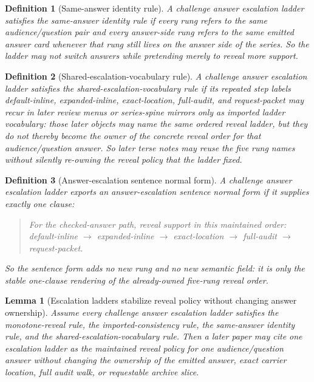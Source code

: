 \documentclass[11pt]{article}
\newtheorem{definition}{Definition}
\newtheorem{lemma}{Lemma}
\begin{document}
\begin{definition}[Same-answer identity rule]
A challenge answer escalation ladder satisfies the \emph{same-answer identity rule} if every rung refers to the same audience/question pair and every answer-side rung refers to the same emitted answer card whenever that rung still lives on the answer side of the series.
So the ladder may not switch answers while pretending merely to reveal more support.
\end{definition}

\begin{definition}[Shared-escalation-vocabulary rule]
A challenge answer escalation ladder satisfies the \emph{shared-escalation-vocabulary rule} if its repeated step labels \textsf{default-inline}, \textsf{expanded-inline}, \textsf{exact-location}, \textsf{full-audit}, and \textsf{request-packet} may recur in later review menus or series-spine mirrors only as imported ladder vocabulary: those later objects may name the same ordered reveal ladder, but they do not thereby become the owner of the concrete reveal order for that audience/question answer.
So later terse notes may reuse the five rung names without silently re-owning the reveal policy that the ladder fixed.
\end{definition}

\begin{definition}[Answer-escalation sentence normal form]
A challenge answer escalation ladder exports an \emph{answer-escalation sentence normal form} if it supplies exactly one clause:
\begin{quote}\small
For the checked-answer path, reveal support in this maintained order: \textsf{default-inline} $\to$ \textsf{expanded-inline} $\to$ \textsf{exact-location} $\to$ \textsf{full-audit} $\to$ \textsf{request-packet}.
\end{quote}
So the sentence form adds no new rung and no new semantic field: it is only the stable one-clause rendering of the already-owned five-rung reveal order.
\end{definition}

\begin{lemma}[Escalation ladders stabilize reveal policy without changing answer ownership]
Assume every challenge answer escalation ladder satisfies the monotone-reveal rule, the imported-consistency rule, the same-answer identity rule, and the shared-escalation-vocabulary rule.
Then a later paper may cite one escalation ladder as the maintained reveal policy for one audience/question answer without changing the ownership of the emitted answer, exact carrier location, full audit walk, or requestable archive slice.
\end{lemma}
\end{document}

